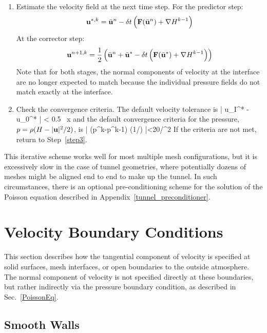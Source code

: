 \begin{enumerate}
\item Estimate the velocity field at the next time step. For the predictor step:
\begin{equation}
\label{eqn_RK1}
\mathbf{u}^{*,k} = \bar{\mathbf{u}}^n - \delta t \left( \mathbf{F}(\bar{\mathbf{u}}^n) + {\nabla H}^{k-1} \right)
\end{equation}
At the corrector step:
\begin{equation}
\label{eqn_RK2}
\mathbf{u}^{n+1,k} = \frac{1}{2} \left( \bar{\mathbf{u}}^n + \bar{\mathbf{u}}^* - \delta t \left( \mathbf{F}(\bar{\mathbf{u}}^*) + {\nabla H}^{k-1} \right) \right)
\end{equation}
Note that for both stages, the normal components of velocity at the interface are no longer expected to match because the individual pressure fields do not match exactly at the interface.

\item Check the convergence criteria. The default velocity tolerance is
   \be
      \left| u_I^* - u_0^* \right| < 0.5 \, \delta x
   \ee
    and the default convergence criteria for the pressure, $p=\rho(H-|{\mathbf{u}}|^2/2)$, is
   \be
      \left| \nabla \cdot (p^k-p^{k-1}) \nabla (1/\rho) \right|<20/\dx^2
   \ee
   If the criteria are not met, return to Step~\ref{step3}.
\end{enumerate}
This iterative scheme works well for most multiple mesh configurations, but it is excessively slow in the case of tunnel geometries, where potentially dozens of meshes might be aligned end to end to make up the tunnel. In such circumstances, there is an optional pre-conditioning scheme for the solution of the Poisson equation described in Appendix~\ref{tunnel_preconditioner}.




\newpage
\section{Velocity Boundary Conditions}
\label{info:velocity_bc}

This section describes how the tangential component of velocity is specified at solid surfaces, mesh interfaces, or open boundaries to the outside atmosphere. The normal component of velocity is not specified directly at these boundaries, but rather indirectly via the pressure boundary condition, as described in Sec.~\ref{PoissonEq}.

\subsection{Smooth Walls}
\label{smooth_wall_model}

